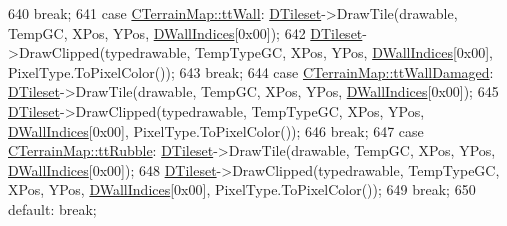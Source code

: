 \begin{DoxyCode}
{{{{{{{{640                                                             \textcolor{keywordflow}{break};
641                         \textcolor{keywordflow}{case} \hyperlink{classCTerrainMap_aff2ab991e237269941416dd79d8871d4a9faa5ddca496d71c34b9d01157de34b2}{CTerrainMap::ttWall}:           
      \hyperlink{classCMapRenderer_ace0648cba050b5e02431096edd15b836}{DTileset}->DrawTile(drawable, TempGC, XPos, YPos, \hyperlink{classCMapRenderer_a5ba880d6fb399fc678321cb1daa2e856}{DWallIndices}[0x00]);
642                                                             \hyperlink{classCMapRenderer_ace0648cba050b5e02431096edd15b836}{DTileset}->DrawClipped(typedrawable, 
      TempTypeGC, XPos, YPos, \hyperlink{classCMapRenderer_a5ba880d6fb399fc678321cb1daa2e856}{DWallIndices}[0x00], PixelType.ToPixelColor());
643                                                             \textcolor{keywordflow}{break};
644                         \textcolor{keywordflow}{case} \hyperlink{classCTerrainMap_aff2ab991e237269941416dd79d8871d4acbd754bea3ab1493a28f3a67596482dd}{CTerrainMap::ttWallDamaged}:    
      \hyperlink{classCMapRenderer_ace0648cba050b5e02431096edd15b836}{DTileset}->DrawTile(drawable, TempGC, XPos, YPos, \hyperlink{classCMapRenderer_a5ba880d6fb399fc678321cb1daa2e856}{DWallIndices}[0x00]);
645                                                             \hyperlink{classCMapRenderer_ace0648cba050b5e02431096edd15b836}{DTileset}->DrawClipped(typedrawable, 
      TempTypeGC, XPos, YPos, \hyperlink{classCMapRenderer_a5ba880d6fb399fc678321cb1daa2e856}{DWallIndices}[0x00], PixelType.ToPixelColor());
646                                                             \textcolor{keywordflow}{break};
647                         \textcolor{keywordflow}{case} \hyperlink{classCTerrainMap_aff2ab991e237269941416dd79d8871d4a0969ea4c56acb3f5acf137c0d06a3371}{CTerrainMap::ttRubble}:         
      \hyperlink{classCMapRenderer_ace0648cba050b5e02431096edd15b836}{DTileset}->DrawTile(drawable, TempGC, XPos, YPos, \hyperlink{classCMapRenderer_a5ba880d6fb399fc678321cb1daa2e856}{DWallIndices}[0x00]);
648                                                             \hyperlink{classCMapRenderer_ace0648cba050b5e02431096edd15b836}{DTileset}->DrawClipped(typedrawable, 
      TempTypeGC, XPos, YPos, \hyperlink{classCMapRenderer_a5ba880d6fb399fc678321cb1daa2e856}{DWallIndices}[0x00], PixelType.ToPixelColor());
649                                                             \textcolor{keywordflow}{break};
650                         \textcolor{keywordflow}{default}:                            \textcolor{keywordflow}{break};
}}}}}}}}
\end{DoxyCode}
